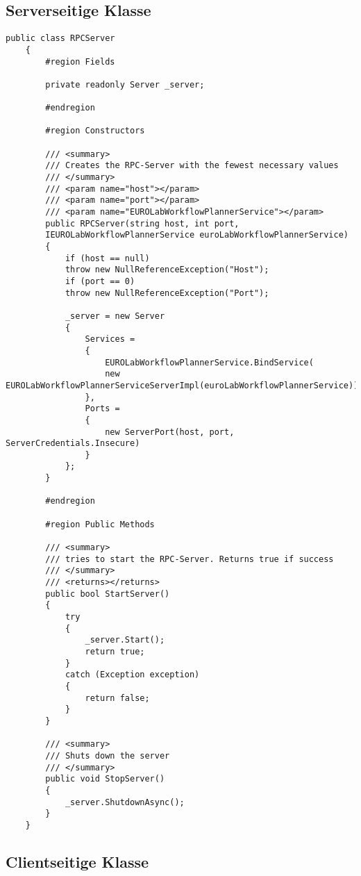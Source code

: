 \subsection{Serverseitige Klasse}
\label{app:ServerseitigeKlasse}

\begin{lstlisting}[caption={Serverseitige Klasse}]
	public class RPCServer
	{
		#region Fields
		
		private readonly Server _server;
		
		#endregion
		
		#region Constructors
		
		/// <summary>
		/// Creates the RPC-Server with the fewest necessary values
		/// </summary>
		/// <param name="host"></param>
		/// <param name="port"></param>
		/// <param name="EUROLabWorkflowPlannerService"></param>
		public RPCServer(string host, int port,
		IEUROLabWorkflowPlannerService euroLabWorkflowPlannerService)
		{
			if (host == null)
			throw new NullReferenceException("Host");
			if (port == 0)
			throw new NullReferenceException("Port");
			
			_server = new Server
			{
				Services =
				{
					EUROLabWorkflowPlannerService.BindService(
					new EUROLabWorkflowPlannerServiceServerImpl(euroLabWorkflowPlannerService))
				},
				Ports =
				{
					new ServerPort(host, port, ServerCredentials.Insecure)
				}
			};
		}
		
		#endregion
		
		#region Public Methods
		
		/// <summary>
		/// tries to start the RPC-Server. Returns true if success
		/// </summary>
		/// <returns></returns>
		public bool StartServer()
		{
			try
			{
				_server.Start();
				return true;
			}
			catch (Exception exception)
			{
				return false;
			}
		}
		
		/// <summary>
		/// Shuts down the server
		/// </summary>
		public void StopServer()
		{
			_server.ShutdownAsync();
		}
	}
\end{lstlisting}

\subsection{Clientseitige Klasse}
\label{app:ClientseitigeKlasse}

